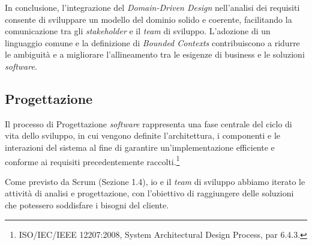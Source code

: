         \noindent In conclusione, l’integrazione del \textit{Domain-Driven Design} nell’analisi dei requisiti consente di sviluppare un modello del dominio solido e coerente, facilitando la comunicazione tra gli \textit{stakeholder} e il \textit{team} di sviluppo. L’adozione di un linguaggio comune e la definizione di \textit{Bounded Contexts} contribuiscono a ridurre le ambiguità e a migliorare l’allineamento tra le esigenze di business e le soluzioni \textit{software}.
        
        \subsection{Progettazione}
        Il processo di Progettazione \textit{software} rappresenta una fase centrale del ciclo di vita dello sviluppo, in cui vengono definite l'architettura, i componenti e le interazioni del sistema al fine di garantire un’implementazione efficiente e conforme ai requisiti precedentemente raccolti.\footnote{ISO/IEC/IEEE 12207:2008, System Architectural Design Process, par 6.4.3.} 

        \vspace{0.2 em}
        \noindent Come previsto da Scrum (Sezione 1.4), io e il \textit{team} di sviluppo abbiamo iterato le attività di analisi e progettazione, con l'obiettivo di raggiungere delle soluzioni che potessero soddisfare i bisogni del cliente.

